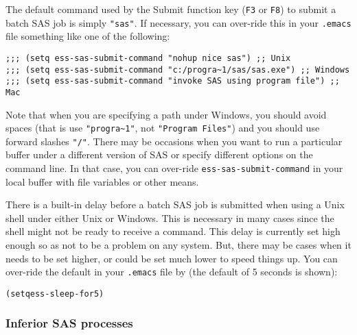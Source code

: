 \documentclass{article}
\newenvironment{Salltt}{\small\begin{alltt}}{\end{alltt}}
\begin{document}
The default command used by the Submit function key ({\tt F3} or {\tt F8}) to
submit a batch SAS job is simply {\tt "sas"}.  If necessary, you can
over-ride this in your \verb+.emacs+ file something like one of the
following:
{\small
\begin{verbatim}
;;; (setq ess-sas-submit-command "nohup nice sas") ;; Unix
;;; (setq ess-sas-submit-command "c:/progra~1/sas/sas.exe") ;; Windows
;;; (setq ess-sas-submit-command "invoke SAS using program file") ;; Mac
\end{verbatim}
}
Note that when you are specifying a path under Windows, you should
avoid spaces (that is use {\verb+"progra~1"+}, not {\tt "Program Files"}) and you
should use forward slashes {\tt "/"}.  There may be occasions when you want
to run a particular buffer under a different version of SAS or specify
different options on the command line.  In that case, you can
over-ride {\tt ess-sas-submit-command} in your local buffer with file
variables or other means.

There is a built-in delay before a batch SAS job is submitted when using
a Unix shell under either Unix or Windows.  This is necessary in many cases 
since the shell might not be ready to receive a command.  This delay is 
currently set high enough so as not to be a problem on any system.  But,
there may be cases when it needs to be set higher, or could be set much
lower to speed things up.  You can over-ride the default in your {\tt .emacs}
file by (the default of 5 seconds is shown):
\begin{Salltt}
(setq ess-sleep-for 5)
\end{Salltt}


% 
% 

\subsubsection{Inferior SAS processes}
\label{sec:SAS:proc:inf}
\end{document}
